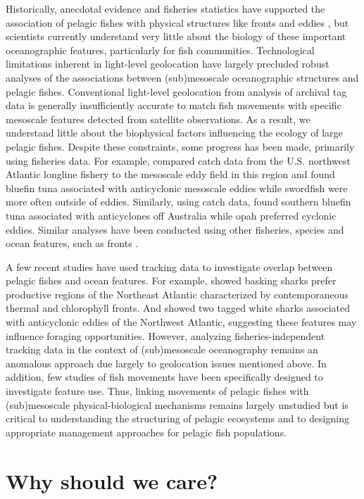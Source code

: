 Historically, anecdotal evidence and fisheries statistics have supported the association of pelagic fishes with physical structures like fronts and eddies \citep[e.g.,][]{Hobday2014}, but scientists currently understand very little about the biology of these important oceanographic features, particularly for fish communities. Technological limitations inherent in light-level geolocation \citep{Braun2015} have largely precluded robust analyses of the associations between (sub)mesoscale oceanographic structures and pelagic fishes. Conventional light-level geolocation from analysis of archival tag data is generally insufficiently accurate to match fish movements with specific mesoscale features detected from satellite observations. As a result, we understand little about the biophysical factors influencing the ecology of large pelagic fishes. Despite these constraints, some progress has been made, primarily using fisheries data. For example, \cite{Hsu2015} compared catch data from the U.S. northwest Atlantic longline fishery to the mesoscale eddy field in this region and found bluefin tuna associated with anticyclonic mesoscale eddies while swordfish were more often outside of eddies. Similarly, using catch data, \cite{Hobday2014} found southern bluefin tuna associated with anticyclones off Australia while opah preferred cyclonic eddies. Similar analyses have been conducted using other fisheries, species and ocean features, such as fronts \citep[\eg][]{Worm2005}.

A few recent studies have used tracking data to investigate overlap between pelagic fishes and ocean features. For example, \cite{Miller2015} showed basking sharks prefer productive regions of the Northeast Atlantic characterized by contemporaneous thermal and chlorophyll fronts. And \cite{Gaube2018} showed two tagged white sharks associated with anticyclonic eddies of the Northwest Atlantic, suggesting these features may influence foraging opportunities. However, analyzing fisheries-independent tracking data in the context of (sub)mesoscale oceanography remains an anomalous approach due largely to geolocation issues mentioned above. In addition, few studies of fish movements have been specifically designed to investigate feature use. Thus, linking movements of pelagic fishes with (sub)mesoscale physical-biological mechanisms remains largely unstudied but is critical to understanding the structuring of pelagic ecosystems and to designing appropriate management approaches for pelagic fish populations.

\section{Why should we care?}
 
